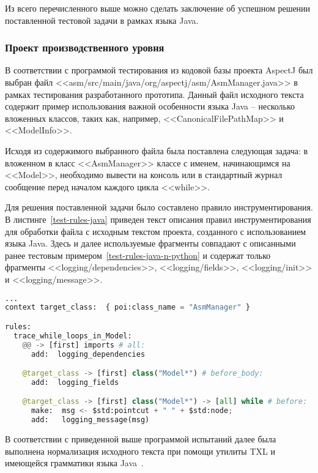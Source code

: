 Из всего перечисленного выше можно сделать заключение об успешном решении поставленной тестовой задачи в рамках языка Java.

\subsubsection{Проект производственного уровня}

В соответствии с программой тестирования из кодовой базы проекта AspectJ был выбран файл <<asm/src/main/java/org/aspectj/asm/AsmManager.java>> в рамках тестирования разработанного прототипа.
Данный файл исходного текста содержит пример использования важной особенности языка Java -- несколько вложенных классов, таких как, например, <<CanonicalFilePathMap>> и <<ModelInfo>>.

Исходя из содержимого выбранного файла была поставлена следующая задача:
в вложенном в класс <<AsmManager>> классе с именем, начинающимся на <<Model>>, необходимо вывести на консоль или в стандартный журнал сообщение перед началом каждого цикла <<while>>.

Для решения поставленной задачи было составлено правило инструментирования.
В листинге~\ref{test-rules-java} приведен текст описания правил инструментирования для обработки файла с исходным текстом проекта, созданного с использованием языка Java.
Здесь и далее используемые фрагменты совпадают с описанными ранее тестовым примером~\ref{test-rules-java-n-python} и содержат только фрагменты <<logging/dependencies>>, <<logging/fields>>, <<logging/init>> и <<logging/message>>.

\begin{lstlisting}[frame=single, language=Python, label={test-rules-java}, caption={Описание правил инструментирования. Java-проект.}]
...
context target_class:  { poi:class_name = "AsmManager" }

rules:
  trace_while_loops_in_Model:
    @@ -> [first] imports # all:
      add:  logging_dependencies

    @target_class -> [first] class("Model*") # before_body:
      add:  logging_fields

    @target_class -> [first] class("Model*") -> [all] while # before:
      make:  msg <- $std:pointcut + " " + $std:node;
      add:   logging_message(msg)
\end{lstlisting}

В соответствии с приведенной выше программой испытаний далее была выполнена нормализация исходного текста при помощи утилиты TXL и имеющейся грамматики языка Java~\cite{txl-resources}.

